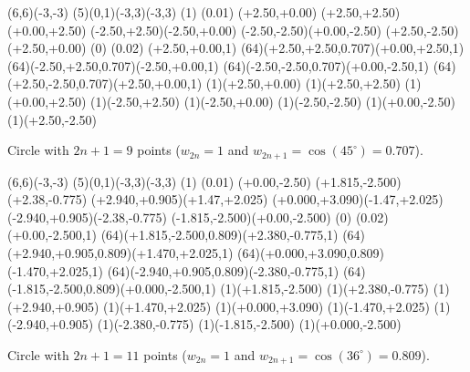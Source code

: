 \begin{center}

\begin{lapdf}(6,6)(-3,-3)
 \Lingrid(5)(0,1)(-3,3)(-3,3)
 \Dash(1)
 \Setwidth(0.01)
 \Polygon(+2.50,+0.00)
 (+2.50,+2.50)(+0.00,+2.50)
 (-2.50,+2.50)(-2.50,+0.00)
 (-2.50,-2.50)(+0.00,-2.50)
 (+2.50,-2.50)(+2.50,+0.00) \Stroke
 \Dash(0)
 \Setwidth(0.02)
 \Red
 \Rmoveto(+2.50,+0.00,1)
 \Rcurveto(64)(+2.50,+2.50,0.707)(+0.00,+2.50,1)
 \Rcurveto(64)(-2.50,+2.50,0.707)(-2.50,+0.00,1)
 \Rcurveto(64)(-2.50,-2.50,0.707)(+0.00,-2.50,1)
 \Rcurveto(64)(+2.50,-2.50,0.707)(+2.50,+0.00,1) \Stroke
 \Black
 \Point(1)(+2.50,+0.00)
 \Point(1)(+2.50,+2.50)
 \Point(1)(+0.00,+2.50)
 \Point(1)(-2.50,+2.50)
 \Point(1)(-2.50,+0.00)
 \Point(1)(-2.50,-2.50)
 \Point(1)(+0.00,-2.50)
 \Point(1)(+2.50,-2.50)
\end{lapdf}

Circle with $2n+1=9$ points ($w_{2n}=1$ and $w_{2n+1} = \cos(45^\circ) = 0.707$).
\end{center}
\begin{center}

\begin{lapdf}(6,6)(-3,-3)
 \Lingrid(5)(0,1)(-3,3)(-3,3)
 \Dash(1)
 \Setwidth(0.01)
 \Polygon(+0.00,-2.50)
 (+1.815,-2.500)(+2.38,-0.775)
 (+2.940,+0.905)(+1.47,+2.025)
 (+0.000,+3.090)(-1.47,+2.025)
 (-2.940,+0.905)(-2.38,-0.775)
 (-1.815,-2.500)(+0.00,-2.500) \Stroke
 \Dash(0)
 \Setwidth(0.02)
 \Red
 \Rmoveto(+0.00,-2.500,1)
 \Rcurveto(64)(+1.815,-2.500,0.809)(+2.380,-0.775,1)
 \Rcurveto(64)(+2.940,+0.905,0.809)(+1.470,+2.025,1)
 \Rcurveto(64)(+0.000,+3.090,0.809)(-1.470,+2.025,1)
 \Rcurveto(64)(-2.940,+0.905,0.809)(-2.380,-0.775,1)
 \Rcurveto(64)(-1.815,-2.500,0.809)(+0.000,-2.500,1) \Stroke
 \Black
 \Point(1)(+1.815,-2.500)
 \Point(1)(+2.380,-0.775)
 \Point(1)(+2.940,+0.905)
 \Point(1)(+1.470,+2.025)
 \Point(1)(+0.000,+3.090)
 \Point(1)(-1.470,+2.025)
 \Point(1)(-2.940,+0.905)
 \Point(1)(-2.380,-0.775)
 \Point(1)(-1.815,-2.500)
 \Point(1)(+0.000,-2.500)
\end{lapdf}

Circle with $2n+1=11$ points ($w_{2n}=1$ and $w_{2n+1} = \cos(36^\circ) = 0.809$).
\end{center}

\pagebreak

